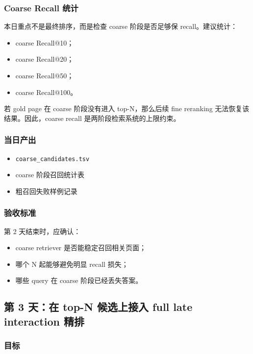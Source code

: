 \documentclass[UTF8,a4paper,12pt]{ctexart}
\begin{document}
	\subsubsection*{Coarse Recall 统计}
	
	本日重点不是最终排序，而是检查 coarse 阶段是否足够保 recall。建议统计：
	
	\begin{itemize}[leftmargin=2em]
		\item coarse Recall@10；
		\item coarse Recall@20；
		\item coarse Recall@50；
		\item coarse Recall@100。
	\end{itemize}
	
	若 gold page 在 coarse 阶段没有进入 top-N，那么后续 fine reranking 无法恢复该结果。因此，coarse recall 是两阶段检索系统的上限约束。
	
	\subsubsection*{当日产出}
	
	\begin{itemize}[leftmargin=2em]
		\item \texttt{coarse\_candidates.tsv}
		\item coarse 阶段召回统计表
		\item 粗召回失败样例记录
	\end{itemize}
	
	\subsubsection*{验收标准}
	
	第 2 天结束时，应确认：
	
	\begin{itemize}[leftmargin=2em]
		\item coarse retriever 是否能稳定召回相关页面；
		\item 哪个 N 起能够避免明显 recall 损失；
		\item 哪些 query 在 coarse 阶段已经丢失答案。
	\end{itemize}
	
	\subsection{第 3 天：在 top-N 候选上接入 full late interaction 精排}
	
	\subsubsection*{目标}
	
\end{document}
